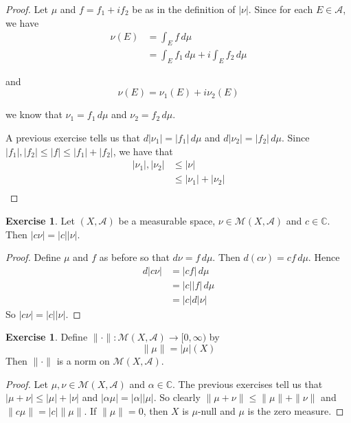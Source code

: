 \documentclass{book}
\theoremstyle{definition}
\newtheorem{ex}[definition]{Exercise}
\newcommand{\al}{\alpha}
\newcommand{\C}{\mathbb{C}}
\newcommand{\MA}{\mathcal{A}}
\newcommand{\MM}{\mathcal{M}}
\newcommand{\lex}[1]{\label{ex:#1}}
\DeclareMathOperator*{\0}{\mbf{0}}
\DeclareMathOperator*{\1}{\mbf{1}}
\newcommand{\Rg}{[0,\infty)}
\newcommand{\dmu}{\, d \mu}
\begin{document}
	\begin{proof}
		Let $\mu$ and $f = f_1 + i f_2$ be as in the definition of $|\nu|$. Since for each $E \in \MA$, we have 
		\begin{align*}
			\nu(E) 
			&= \int_E f \dmu\\
			&= \int_E f_1 \dmu + i \int_E f_2 \dmu
		\end{align*}
		
		and $$\nu(E) = \nu_1(E) + i\nu_2(E)$$
		
		we know that $\nu_1 = f_1 \dmu$ and $\nu_2 = f_2 \dmu$. 
		
		A previous exercise tells us that $d|\nu_1| = |f_1|\dmu$ and $d |\nu_2| = |f_2|\dmu$. Since $|f_1|, |f_2| \leq |f| \leq |f_1|+|f_2|$, we have that 
		\begin{align*}
			|\nu_1|, |\nu_2| 
			&\leq |\nu| \\
			&\leq |\nu_1| + |\nu_2|\\
		\end{align*}
	\end{proof}
	
	\begin{ex} \lex{43007} 
		Let  $(X, \MA)$ be a measurable space, $\nu \in \MM(X, \MA)$ and $c \in \C$. Then $| c \nu | = | c | | \nu |$.
	\end{ex}
	
	\begin{proof}
		Define $\mu$ and $f$ as before so that $d \nu = f \dmu$. Then $d (c \nu) = c f \dmu$. Hence 
		\begin{align*}
			d | c \nu | 
			&= | cf | \dmu \\
			&= | c | | f | \dmu\\
			&= | c | d| \nu |
		\end{align*}
		So $| c \nu | = | c | |  \nu |$.
	\end{proof}

	\begin{ex} \lex{43008} 
	Define $\|\cdot \|: \MM(X, \MA) \rightarrow \Rg$ by $$\|\mu \|= | \mu | (X)$$ 
	Then $\|\cdot \|$ is a norm on $\MM(X, \MA)$. 
	\end{ex}
	
	\begin{proof}
		Let $\mu, \nu \in \MM(X, \MA)$ and $\al \in \C$. The previous exercises tell us that $| \mu + \nu | \leq | \mu | + | \nu |$ and $| \al \mu | = | \al | | \mu |$. So clearly $\|\mu + \nu \|\leq \|\mu \|+ \|\nu \|$ and $\|c \mu \|= | c | \|\mu \|$. If $\|\mu \|= 0$, then $X$ is $\mu$-null and $\mu$ is the zero measure.
	\end{proof}
	
\end{document}
